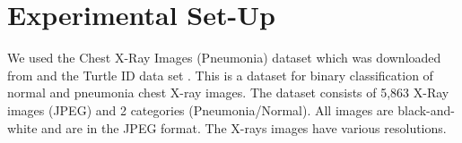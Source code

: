 \documentclass[12pt]{article}
\begin{document}




\section{Experimental Set-Up}



We used the Chest X-Ray Images (Pneumonia) dataset which was downloaded from \cite{kermany2018large} and the Turtle ID data set \cite{Adam_2024_WACV}.
This is a dataset for binary classification of normal and pneumonia chest X-ray images. 
The dataset consists of 5,863 X-Ray images (JPEG) and 2 categories (Pneumonia/Normal).
All images are black-and-white and are in the JPEG format.
The X-rays images have various resolutions.
\end{document}
